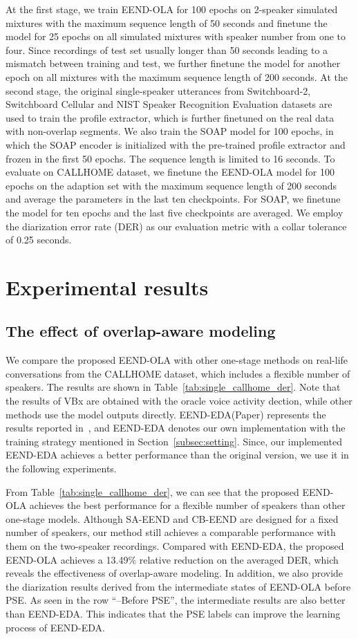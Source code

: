 \documentclass{article}
\begin{document}
At the first stage, we train EEND-OLA for 100 epochs on 2-speaker simulated mixtures with the maximum sequence length of 50 seconds and finetune the model for 25 epochs on all simulated mixtures with speaker number from one to four. Since recordings of test set usually longer than 50 seconds leading to a mismatch between training and test, we further finetune the model for another epoch on all mixtures with the maximum sequence length of 200 seconds.
At the second stage, the original single-speaker utterances from Switchboard-2, Switchboard Cellular and NIST Speaker Recognition Evaluation datasets are used to train the profile extractor, which is further finetuned on the real data with non-overlap segments.
We also train the SOAP model for 100 epochs, in which the SOAP encoder is initialized with the pre-trained profile extractor and frozen in the first 50 epochs. The sequence length is limited to 16 seconds.
To evaluate on CALLHOME dataset, we finetune the EEND-OLA model for 100 epochs on the adaption set with the maximum sequence length of 200 seconds and average the parameters in the last ten checkpoints. For SOAP, we finetune the model for ten epochs and the last five checkpoints are averaged. We employ the diarization error rate (DER) as our evaluation metric with a collar tolerance of 0.25 seconds.

\section{Experimental results}
\subsection{The effect of overlap-aware modeling}
We compare the proposed EEND-OLA with other one-stage methods on real-life conversations from the CALLHOME dataset, which includes a flexible number of speakers. The results are shown in Table~\ref{tab:single_callhome_der}. Note that the results of VBx are obtained with the oracle voice activity dection, while other methods use the model outputs directly. EEND-EDA(Paper) represents the results reported in~\cite{EEND_EDA}, and EEND-EDA denotes our own implementation with the training strategy mentioned in Section~\ref{subsec:setting}. Since, our implemented EEND-EDA achieves a better performance than the original version, we use it in the following experiments.

From Table~\ref{tab:single_callhome_der}, we can see that the proposed EEND-OLA achieves the best performance for a flexible number of speakers than other one-stage models.
Although SA-EEND and CB-EEND are designed for a fixed number of speakers, our method still achieves a comparable performance with them on the two-speaker recordings.
Compared with EEND-EDA, the proposed EEND-OLA achieves a 13.49\% relative reduction on the averaged DER, which reveals the effectiveness of overlap-aware modeling.
In addition, we also provide the diarization results derived from the intermediate states of EEND-OLA before PSE. As seen in the row ``--Before PSE'', the intermediate results are also better than EEND-EDA. This indicates that the PSE labels can improve the learning process of EEND-EDA.
\end{document}
